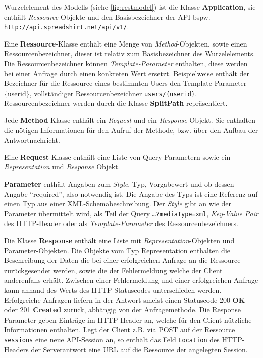 Wurzelelement des Modells (siehe \cref{fig:restmodel}) ist die Klasse \textbf{Application}, sie enthält \emph{Ressource}-Objekte und den Basisbezeichner der API bspw. \texttt{\small http://api.spreadshirt.net/api/v1/}. 

Eine \textbf{Ressource}-Klasse enthält eine Menge von \emph{Method}-Objekten, sowie einen Ressourcenbezeichner, dieser ist relativ zum Basisbezeichner des Wurzelelements. Die Ressourcenbezeichner können \emph{Template-Parameter} enthalten, diese werden bei einer Anfrage durch einen konkreten Wert ersetzt. Beispielweise enthält der Bezeichner für die Ressource eines bestimmten Users den Template-Parameter \{userid\}, vollständiger Ressourcenbezeichner \texttt{users/\{userid\}}. Ressourcenbezeichner werden durch die Klasse \textbf{SplitPath} repräsentiert. 

Jede \textbf{Method}-Klasse enthält ein \emph{Request} und ein \emph{Response} Objekt. Sie enthalten die nötigen Informationen für den Aufruf der Methode, bzw. über den Aufbau der Antwortnachricht.

Eine \textbf{Request}-Klasse enthält eine Liste von Query-Parametern sowie ein \emph{Representation} und \emph{Response} Objekt.

\textbf{Parameter} enthält Angaben zum \emph{Style}, Typ, Vorgabewert und ob dessen Angabe \enquote{required}, also notwendig ist. Die Angabe des Typs ist eine Referenz auf einen Typ aus einer XML-Schemabeschreibung. Der \emph{Style} gibt an wie der Parameter übermittelt wird, als Teil der Query \texttt{\ldots{}?mediaType=xml}, \emph{Key-Value Pair} des HTTP-Header oder als \emph{Template-Parameter} des Ressourcenbezeichners. 

Die Klasse \textbf{Response} enthält eine Liste mit \emph{Representation}-Objekten und Parameter-Objekten. Die Objekte vom Typ Representation enthalten die Beschreibung der Daten die bei einer erfolgreichen Anfrage an die Ressource zurückgesendet werden, sowie die der Fehlermeldung welche der Client anderenfalls erhält. Zwischen einer Fehlermeldung und einer erfolgreichen Anfrage kann anhand des Werts des HTTP-Statuscodes unterschieden werden. Erfolgreiche Anfragen liefern in der Antwort smeist einen Statuscode 200 \textbf{OK} oder 201 \textbf{Created} zurück, abhängig von der Anfragemethode. Die Response Parameter geben Einträge im HTTP-Header an, welche für den Client nützliche Informationen enthalten. Legt der Client z.B. via POST auf der Ressource \texttt{sessions} eine neue API-Session an, so enthält das Feld \texttt{Location} des HTTP-Headers der Serverantwort eine URL auf die Ressource der angelegten Session.

